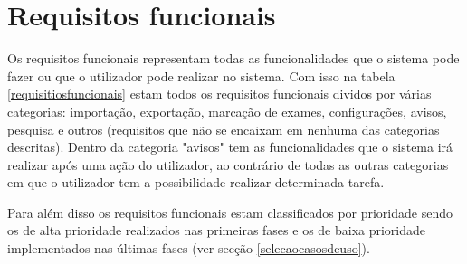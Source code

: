 \documentclass[11pt, twoside]{report}
\begin{document}
	\section{Requisitos funcionais}
	
	
	Os requisitos funcionais representam todas as funcionalidades que o sistema pode fazer ou que o utilizador pode realizar no sistema. Com isso na tabela \ref{requisitiosfuncionais} estam todos os requisitos funcionais dividos por várias categorias: importação, exportação, marcação de exames, configurações, avisos, pesquisa e outros (requisitos que não se encaixam em nenhuma das categorias descritas). Dentro da categoria "avisos" tem as funcionalidades que o sistema irá realizar após uma ação do utilizador, ao contrário de todas as outras categorias em que o utilizador tem a possibilidade realizar determinada tarefa.
	
	Para além disso os requisitos funcionais estam classificados por prioridade sendo os de alta prioridade realizados nas primeiras fases e os de baixa prioridade implementados nas últimas fases (ver secção \ref{selecaocasosdeuso}).  
	
	
	
\end{document}
